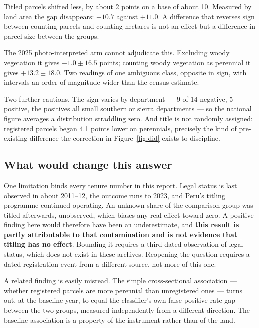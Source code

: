 \documentclass[11pt,a4paper]{article}
\begin{document}
Titled parcels shifted less, by about 2 points on a base of about 10. Measured by land area the
gap disappears: $+10.7$ against $+11.0$. A difference that reverses sign between counting parcels
and counting hectares is not an effect but a difference in parcel size between the groups.

The 2025 photo-interpreted arm cannot adjudicate this. Excluding woody vegetation it gives
$-1.0 \pm 16.5$ points; counting woody vegetation as perennial it gives $+13.2 \pm 18.0$. Two
readings of one ambiguous class, opposite in sign, with intervals an order of magnitude wider
than the census estimate.

Two further cautions. The sign varies by department --- 9 of 14 negative, 5 positive, the
positives all small southern or sierra departments --- so the national figure averages a
distribution straddling zero. And title is not randomly assigned: registered parcels began 4.1
points lower on perennials, precisely the kind of pre-existing difference the correction in
Figure~\ref{fig:did} exists to discipline.

\subsection{What would change this answer}

One limitation binds every tenure number in this report. Legal status is last observed in about
2011--12, the outcome runs to 2023, and Peru's titling programme continued operating. An unknown
share of the comparison group was titled afterwards, unobserved, which biases any real effect
toward zero. A positive finding here would therefore have been an underestimate, and \textbf{this
result is partly attributable to that contamination and is not evidence that titling has no
effect}. Bounding it requires a third dated observation of legal status, which does not exist in
these archives. Reopening the question requires a dated registration event from a different
source, not more of this one.

A related finding is easily misread. The simple cross-sectional association --- whether
registered parcels are more perennial than unregistered ones --- turns out, at the baseline year,
to equal the classifier's own false-positive-rate gap between the two groups, measured
independently from a different direction. The baseline association is a property of the
instrument rather than of the land.

\end{document}
